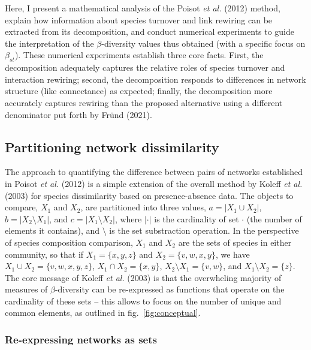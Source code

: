 \documentclass[10pt,oneside]{article}
\begin{document}
Here, I present a mathematical analysis of the Poisot \emph{et al.}
(2012) method, explain how information about species turnover and link
rewiring can be extracted from its decomposition, and conduct numerical
experiments to guide the interpretation of the \(\beta\)-diversity
values thus obtained (with a specific focus on \(\beta_{st}\)). These
numerical experiments establish three core facts. First, the
decomposition adequately captures the relative roles of species turnover
and interaction rewiring; second, the decomposition responds to
differences in network structure (like connectance) as expected;
finally, the decomposition more accurately captures rewiring than the
proposed alternative using a different denominator put forth by Fründ
(2021).

\hypertarget{partitioning-network-dissimilarity}{%
\subsection{Partitioning network
dissimilarity}\label{partitioning-network-dissimilarity}}

The approach to quantifying the difference between pairs of networks
established in Poisot \emph{et al.} (2012) is a simple extension of the
overall method by Koleff \emph{et al.} (2003) for species dissimilarity
based on presence-absence data. The objects to compare, \(X_1\) and
\(X_2\), are partitioned into three values, \(a = |X_1 \cup X_2|\),
\(b = |X_2 \setminus X_1|\), and \(c = |X_1 \setminus X_2|\), where
\(|\cdot|\) is the cardinality of set \(\cdot\) (the number of elements
it contains), and \(\setminus\) is the set substraction operation. In
the perspective of species composition comparison, \(X_1\) and \(X_2\)
are the sets of species in either community, so that if
\(X_1 = \{x, y, z\}\) and \(X_2 = \{v, w, x, y\}\), we have
\(X_1 \cup X_2 = \{v, w, x, y, z\}\), \(X_1 \cap X_2 = \{x, y\}\),
\(X_2 \setminus X_1 = \{v, w\}\), and \(X_1 \setminus X_2 = \{z\}\). The
core message of Koleff \emph{et al.} (2003) is that the overwheling
majority of measures of \(\beta\)-diversity can be re-expressed as
functions that operate on the cardinality of these sets -- this allows
to focus on the number of unique and common elements, as outlined in
fig.~\ref{fig:conceptual}.

\hypertarget{re-expressing-networks-as-sets}{%
\subsubsection{Re-expressing networks as
sets}\label{re-expressing-networks-as-sets}}
\end{document}
